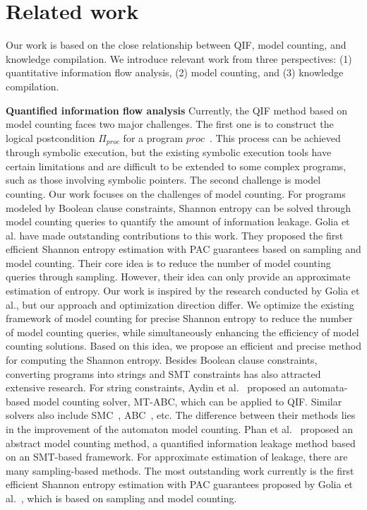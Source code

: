 \section{Related work}
\label{sec:Related}
Our work is based on the close relationship between QIF, model counting, and knowledge compilation.
We introduce relevant work from three perspectives: (1) quantitative information flow analysis, (2) model counting, and (3) knowledge compilation.

\textbf{Quantified information flow analysis} 
Currently, the QIF method based on model counting faces two major challenges. 
The first one is to construct the logical postcondition $\Pi_{proc}$ for a program $proc$~\cite{zhou2018static}.
This process can be achieved through symbolic execution, but the existing symbolic execution tools have certain limitations and are difficult to be extended to some complex programs, such as those involving symbolic pointers.
The second challenge is model counting.
Our work focuses on the challenges of model counting. 
For programs modeled by Boolean clause constraints, Shannon entropy can be solved through model counting queries to quantify the amount of information leakage.
Golia et al. have made outstanding contributions to this work. They proposed the first efficient Shannon entropy estimation\cite{golia2022scalable} with PAC guarantees based on sampling and model counting.
Their core idea is to reduce the number of model counting queries through sampling. However, their idea can only provide an approximate estimation of entropy.
Our work is inspired by the research conducted by Golia et al., but our approach and optimization direction differ. 
We optimize the existing framework of model counting for precise Shannon entropy to reduce the number of model counting queries, while simultaneously enhancing the efficiency of model counting solutions. 
Based on this idea, we propose an efficient and precise method for computing the Shannon entropy.
Besides Boolean clause constraints, converting programs into strings and SMT constraints has also attracted extensive research.
For string constraints, Aydin et al.~\cite{aydin2018parameterized} proposed an automata-based model counting solver, MT-ABC, which can be applied to QIF.
Similar solvers also include SMC~\cite{luu2014model}, ABC~\cite{aydin2015automata}, etc. 
The difference between their methods lies in the improvement of the automaton model counting.
Phan et al.~\cite{phan2014abstract} proposed an abstract model counting method, a quantified information leakage method based on an SMT-based framework.
For approximate estimation of leakage, there are many sampling-based methods. 
The most outstanding work currently is the first efficient Shannon entropy estimation with PAC guarantees proposed by Golia et al.~\cite{golia2022scalable}, which is based on sampling and model counting.

